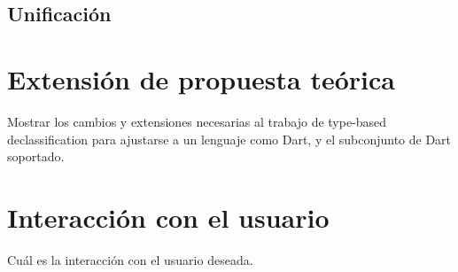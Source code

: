 \subsection{Unificación}


\section{Extensión de propuesta teórica}
Mostrar los cambios y extensiones necesarias al trabajo de type-based declassification para ajustarse a un lenguaje como Dart, y el subconjunto de Dart soportado.

\section{Interacción con el usuario}
Cuál es la interacción con el usuario deseada.
